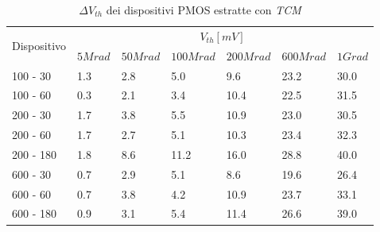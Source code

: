 \documentclass[12pt, letterpaper]{book}
\begin{document}
\begin{table}[H]
  \renewcommand{\arraystretch}{1.3}
    \begin{tabular}{m{2cm}  m{1.1cm} m{1.3cm} m{1.5cm} m{1.5cm} m{1.5cm} m{1cm}}
      \toprule
      \multirow{2}{*}{Dispositivo} & \multicolumn{6}{c}{$V_{th} [mV] $}                                                                    \\
      \cmidrule{2-7}
                                   & $5Mrad$ & $50Mrad$ & $100Mrad$ & $200Mrad$ & $600Mrad$ & $1Grad$ \\
      \midrule
      100 - 30               	& 1.3   	& 2.8    	&  5.0    & 9.6     	& 23.2     	& 30.0   \\
      \hline
      100 - 60                 	& 0.3   	& 2.1    	& 3.4     & 10.4    	& 22.5     	& 31.5   \\
      \hline
      200 - 30                  	& 1.7   	& 3.8  	& 5.5     & 10.9    	&  23.0    	& 30.5   \\
      \hline
      200 - 60                    & 1.7   	& 2.7   	& 5.1     & 10.3   		& 23.4     	& 32.3  \\
      \hline
      200 - 180 			& 1.8   	& 8.6    	& 11.2   & 16.0   		& 28.8    	& 40.0   \\
      \hline
      600 - 30                  	& 0.7   	& 2.9    	& 5.1     &  8.6   		& 19.6     	& 26.4   \\
      \hline
      600 - 60                    & 0.7   	& 3.8    	& 4.2     & 10.9    	&  23.7    	& 33.1  \\
      \hline
      600 - 180              	& 0.9  	& 3.1    	& 5.4     & 11.4    	& 26.6     	&39.0   \\
      \bottomrule
    \end{tabular}
  \caption{$\Delta V_{th}$ dei dispositivi PMOS estratte con \emph{TCM}}
  \label{tab:deltaVthTCMP}
\end{table}
\end{document}
